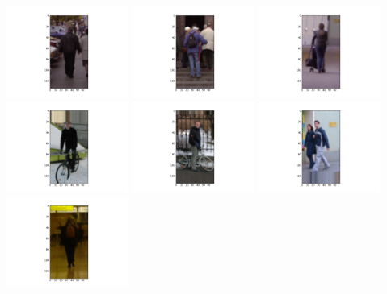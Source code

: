 \documentclass{report}
\begin{document}
\noindent
\includegraphics[width=4cm]{dbshow-0-0.png} 
\includegraphics[width=4cm]{dbshow-0-1.png} 
\includegraphics[width=4cm]{dbshow-0-2.png} 
\includegraphics[width=4cm]{dbshow-0-3.png} 
\includegraphics[width=4cm]{dbshow-0-4.png} 
\includegraphics[width=4cm]{dbshow-0-5.png} 
\includegraphics[width=4cm]{dbshow-0-6.png} 
\end{document}
